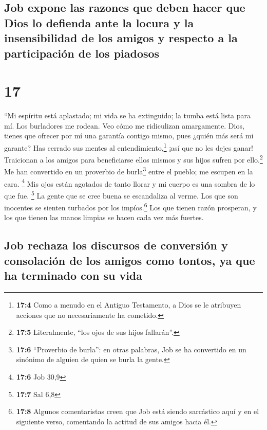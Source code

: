 \hypertarget{job-expone-las-razones-que-deben-hacer-que-dios-lo-defienda-ante-la-locura-y-la-insensibilidad-de-los-amigos-y-respecto-a-la-participaciuxf3n-de-los-piadosos}{%
\subsection{Job expone las razones que deben hacer que Dios lo defienda
ante la locura y la insensibilidad de los amigos y respecto a la
participación de los
piadosos}\label{job-expone-las-razones-que-deben-hacer-que-dios-lo-defienda-ante-la-locura-y-la-insensibilidad-de-los-amigos-y-respecto-a-la-participaciuxf3n-de-los-piadosos}}

\hypertarget{section-16}{%
\section{17}\label{section-16}}

 ``Mi espíritu está aplastado; mi vida se ha extinguido;
la tumba está lista para mí.  Los burladores me rodean.
Veo cómo me ridiculizan amargamente.  Dios, tienes que
ofrecer por mí una garantía contigo mismo, pues ¿quién más será mi
garante?  Has cerrado sus mentes al
entendimiento,\footnote{\textbf{17:4} Como a menudo en el Antiguo
  Testamento, a Dios se le atribuyen acciones que no necesariamente ha
  cometido.} ¡así que no les dejes ganar!  Traicionan a
los amigos para beneficiarse ellos mismos y sus hijos sufren por
ello.\footnote{\textbf{17:5} Literalmente, ``los ojos de sus hijos
  fallarán''.}  Me han convertido en un proverbio de
burla\footnote{\textbf{17:6} ``Proverbio de burla'': en otras palabras,
  Job se ha convertido en un sinónimo de alguien de quien se burla la
  gente.} entre el pueblo; me escupen en la cara. \footnote{\textbf{17:6}
  Job 30,9}  Mis ojos están agotados de tanto llorar y mi
cuerpo es una sombra de lo que fue. \footnote{\textbf{17:7} Sal 6,8}
 La gente que se cree buena se escandaliza al verme. Los
que son inocentes se sienten turbados por los impíos.\footnote{\textbf{17:8}
  Algunos comentaristas creen que Job está siendo sarcástico aquí y en
  el siguiente verso, comentando la actitud de sus amigos hacia él.}
 Los que tienen razón prosperan, y los que tienen las
manos limpias se hacen cada vez más fuertes.

\hypertarget{job-rechaza-los-discursos-de-conversiuxf3n-y-consolaciuxf3n-de-los-amigos-como-tontos-ya-que-ha-terminado-con-su-vida}{%
\subsection{Job rechaza los discursos de conversión y consolación de los
amigos como tontos, ya que ha terminado con su
vida}\label{job-rechaza-los-discursos-de-conversiuxf3n-y-consolaciuxf3n-de-los-amigos-como-tontos-ya-que-ha-terminado-con-su-vida}}

